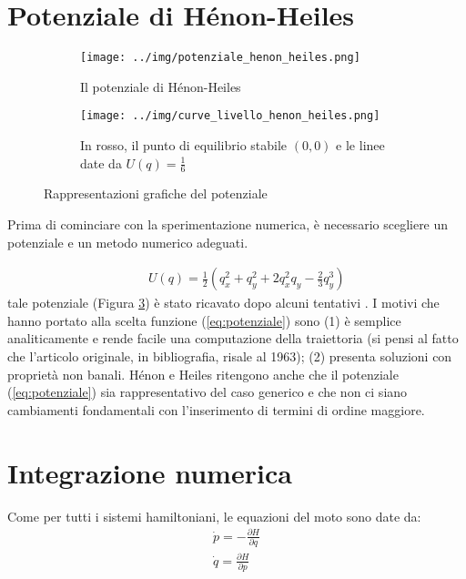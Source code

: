 \documentclass[a4paper]{article}
\numberwithin{equation}{section}
\numberwithin{figure}{section}
\begin{document}
\section{Potenziale di Hénon-Heiles}

\begin{figure}[h!]
	\centering
	\begin{subfigure}[t]{.5\textwidth}
		\centering
		\texttt{[image: ../img/potenziale\_henon\_heiles.png]}
		\caption{Il potenziale di Hénon-Heiles}
		\label{img:potenziale3d}
	\end{subfigure}%
	\begin{subfigure}[t]{.5\textwidth}
		\centering
		\texttt{[image: ../img/curve\_livello\_henon\_heiles.png]}
		\caption{In rosso, il punto di equilibrio stabile $(0,0)$ e le linee date da
		$U(q)=\frac{1}{6}$} 
		\label{img:curvelivello}
	\end{subfigure}
	\caption{Rappresentazioni grafiche del potenziale}
	\label{img:potenzialehh}
\end{figure}

Prima di cominciare con la sperimentazione numerica, è necessario scegliere un potenziale e un
metodo numerico adeguati.

\begin{eqnarray}	
	&&U(q) = \frac{1}{2}(q_x^2+q_y^2+2q_x^2q_y-\frac{2}{3}q_y^3) \label{eq:potenziale}
\end{eqnarray}
tale potenziale (Figura \ref{img:potenzialehh}) è stato ricavato dopo alcuni tentativi
\cite{1964henonheiles}.
I motivi che hanno portato alla scelta funzione (\ref{eq:potenziale}) sono (1)
è semplice analiticamente e rende facile una computazione della traiettoria (si pensi al fatto
che l'articolo originale, \cite{1964henonheiles} in bibliografia, risale al 1963);
(2) presenta soluzioni con proprietà non banali\cite{hairer}. 
Hénon e Heiles ritengono anche che il potenziale (\ref{eq:potenziale}) sia rappresentativo del caso
generico e che non ci siano cambiamenti fondamentali con l'inserimento di termini di ordine maggiore.

\section{Integrazione numerica}

Come per tutti i sistemi hamiltoniani, le equazioni del moto sono date da:
\begin{eqnarray}
	\dot{p} = -\frac{\partial H}{\partial q}\\
	\dot{q} = \frac{\partial H}{\partial p}
\end{eqnarray}
\end{document}
